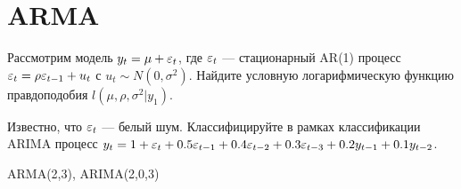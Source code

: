 \chapter{ARMA}

\begin{problem}
Рассмотрим модель $y_t=\mu + \varepsilon_t$, где $\varepsilon_t$ — стационарный AR(1) процесс $\varepsilon_t=\rho \varepsilon_{t-1} + u_t$ с $u_t \sim N(0,\sigma^2)$. Найдите условную логарифмическую функцию правдоподобия $l(\mu, \rho, \sigma^2 | y_1)$.
\begin{sol}

\end{sol}
\end{problem}

\begin{problem}
Известно, что $\varepsilon_t$ — белый шум. Классифицируйте в рамках классификации ARIMA процесс $y_t=1+\varepsilon_t + 0.5\varepsilon_{t-1} + 0.4\varepsilon_{t-2} + 0.3\varepsilon_{t-3} + 0.2y_{t-1} + 0.1y_{t-2}$.
\begin{sol}

ARMA(2,3), ARIMA(2,0,3)
\end{sol}
\end{problem}


